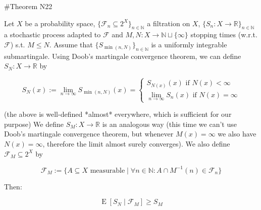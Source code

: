 \documentclass[a4paper]{article}
\DeclareMathOperator{\E}{E}
\newcommand{\Nats}{\mathbb{N}}
\newcommand{\Reals}{\mathbb{R}}
\newcommand{\Sq}[2]{\{#1\}_{#2 \in \Nats}}
\newcommand{\Sqn}[1]{\Sq{#1}{n}}
\newcommand{\F}{\mathcal{F}}
\begin{document}
\#Theorem N22

Let ${X}$ be a probability space, ${\Sqn{\F_n \subseteq 2^X}}$ a filtration on ${X}$, ${\Sqn{S_n: X \rightarrow \Reals}}$ a stochastic process adapted to ${\F}$ and ${M,N: X \rightarrow \Nats \sqcup \{\infty\}}$ stopping times (w.r.t. ${\F}$) s.t. ${M \leq N}$. Assume that ${\Sqn{S_{\min(n,N)}}}$ is a uniformly integrable submartingale. Using Doob's martingale convergence theorem, we can define ${S_N : X \rightarrow \Reals}$ by

$$S_N(x):=\lim_{n \rightarrow \infty} S_{\min(n,N)}(x)=\begin{cases}S_{N(x)}(x) \text{ if } N(x) < \infty\\\lim_{n \rightarrow \infty} S_n(x) \text{ if } N(x) = \infty\end{cases}$$

(the above is well-defined *almost* everywhere, which is sufficient for our purpose) We define ${S_M: X \rightarrow \Reals}$ is an analogous way (this time we can't use Doob's martingale convergence theorem, but whenever ${M(x) = \infty}$ we also have ${N(x) = \infty}$, therefore the limit almost surely converges). We also define ${\F_M \subseteq 2^X}$ by

$$\F_M:=\{A \subseteq X \text{ measurable} \mid \forall n \in \Nats: A \cap M^{-1}(n) \in \F_n\}$$

Then:

$$\E[S_N \mid \F_M] \geq S_M$$
\end{document}
